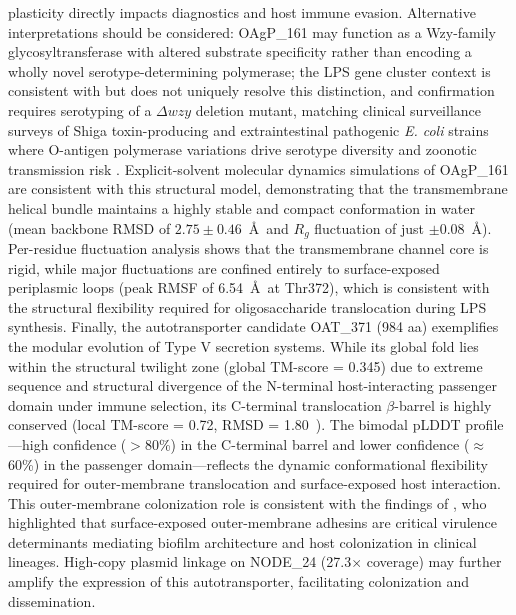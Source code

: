 \documentclass[pdflatex,sn-mathphys-num]{sn-jnl}
\begin{document}
plasticity directly impacts diagnostics and host immune evasion. Alternative interpretations should be considered: OAgP\_161 may function as a Wzy-family glycosyltransferase with altered substrate specificity rather than encoding a wholly novel serotype-determining polymerase; the LPS gene cluster context is consistent with but does not uniquely resolve this distinction, and confirmation requires serotyping of a $\Delta wzy$ deletion mutant, matching clinical surveillance surveys of Shiga toxin-producing and extraintestinal pathogenic \textit{E. coli} strains where O-antigen polymerase variations drive serotype diversity and zoonotic transmission risk \cite{vanhoek2023virulence}. Explicit-solvent molecular dynamics simulations of OAgP\_161 are consistent with this structural model, demonstrating that the transmembrane helical bundle maintains a highly stable and compact conformation in water (mean backbone RMSD of $2.75 \pm 0.46$~\AA\ and $R_g$ fluctuation of just $\pm$0.08~\AA). Per-residue fluctuation analysis shows that the transmembrane channel core is rigid, while major fluctuations are confined entirely to surface-exposed periplasmic loops (peak RMSF of 6.54~\AA\ at Thr372), which is consistent with the structural flexibility required for oligosaccharide translocation during LPS synthesis. Finally, the autotransporter candidate OAT\_371 (984 aa) exemplifies the modular evolution of Type V secretion systems. While its global fold lies within the structural twilight zone (global TM-score = 0.345) due to extreme sequence and structural divergence of the N-terminal host-interacting passenger domain under immune selection, its C-terminal translocation $\beta$-barrel is highly conserved (local TM-score = 0.72, RMSD = 1.80~\text{\AA}). The bimodal pLDDT profile—high confidence ($>$80\%) in the C-terminal barrel and lower confidence ($\approx$60\%) in the passenger domain—reflects the dynamic conformational flexibility required for outer-membrane translocation and surface-exposed host interaction. This outer-membrane colonization role is consistent with the findings of \cite{silva2022evolutionary}, who highlighted that surface-exposed outer-membrane adhesins are critical virulence determinants mediating biofilm architecture and host colonization in clinical lineages. High-copy plasmid linkage on NODE\_24 (27.3$\times$ coverage) may further amplify the expression of this autotransporter, facilitating colonization and dissemination.
\end{document}
